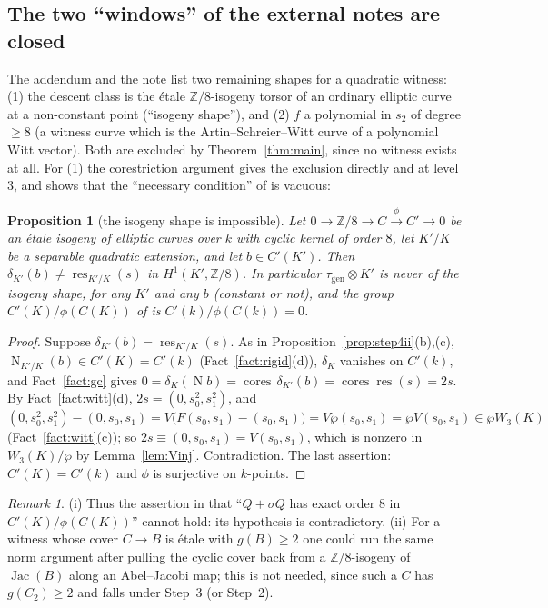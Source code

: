 \documentclass[11pt]{amsart}
\newtheorem{proposition}[theorem]{Proposition}
\theoremstyle{definition}
\theoremstyle{remark}
\newtheorem{remark}[theorem]{Remark}
\newcommand{\gen}{\mathrm{gen}}
\newcommand{\Z}{\mathbb Z}
\newcommand{\res}{\operatorname{res}}
\newcommand{\cores}{\operatorname{cores}}
\newcommand{\Nm}{\operatorname{N}}
\begin{document}
\subsection{The two ``windows'' of the external notes are closed}

The addendum \cite[Remark 11.12]{A} and the note \cite[Cor.~7.2]{S} list
two remaining shapes for a quadratic witness: (1) the descent class is the \'etale
$\Z/8$-isogeny torsor of an ordinary elliptic curve at a non-constant point (``isogeny
shape''), and (2) $f$ a polynomial in $s_2$ of degree $\ge8$ (a witness curve which is the
Artin--Schreier--Witt curve of a polynomial Witt vector). Both are excluded by
Theorem~\ref{thm:main}, since no witness exists at all. For (1) the corestriction
argument gives the exclusion directly and at level $3$, and shows that the ``necessary
condition'' of \cite[Prop.~7.1]{S} is vacuous:

\begin{proposition}[the isogeny shape is impossible]\label{prop:isogeny3}
Let $0\to\Z/8\to C\xrightarrow{\phi}C'\to0$ be an \'etale isogeny of elliptic curves over
$k$ with cyclic kernel of order $8$, let $K'/K$ be a separable quadratic extension, and
let $b\in C'(K')$. Then $\delta_{K'}(b)\ne\res_{K'/K}(s)$ in $H^1(K',\Z/8)$. In
particular $\tau_{\gen}\otimes K'$ is never of the isogeny shape, for any $K'$ and any
$b$ (constant or not), and the group $C'(K)/\phi(C(K))$ of \cite[Prop.~7.1]{S} is
$C'(k)/\phi(C(k))=0$.
\end{proposition}

\begin{proof}
Suppose $\delta_{K'}(b)=\res_{K'/K}(s)$. As in Proposition~\ref{prop:step4ii}(b),(c),
$\Nm_{K'/K}(b)\in C'(K)=C'(k)$ (Fact~\ref{fact:rigid}(d)), $\delta_K$ vanishes on
$C'(k)$, and Fact~\ref{fact:gc} gives
$0=\delta_K(\Nm b)=\cores\,\delta_{K'}(b)=\cores\res(s)=2s$. By Fact~\ref{fact:witt}(d),
$2s=(0,s_0^2,s_1^2)$, and
\[
(0,s_0^2,s_1^2)-(0,s_0,s_1)=V\bigl(F(s_0,s_1)-(s_0,s_1)\bigr)=V\wp(s_0,s_1)=\wp V(s_0,s_1)\in\wp W_3(K)
\]
(Fact~\ref{fact:witt}(c)); so $2s\equiv(0,s_0,s_1)=V(s_0,s_1)$, which is nonzero in
$W_3(K)/\wp$ by Lemma~\ref{lem:Vinj}. Contradiction. The last assertion:
$C'(K)=C'(k)$ and $\phi$ is surjective on $k$-points.
\end{proof}

\begin{remark}
(i) Thus the assertion in \cite[Prop.~7.1]{S} that ``$Q+\sigma Q$ has exact order $8$ in
$C'(K)/\phi(C(K))$'' cannot hold: its hypothesis is contradictory. (ii) For a witness
whose cover $C\to B$ is \'etale with $g(B)\ge2$ one could run the same norm argument
after pulling the cyclic cover back from a $\Z/8$-isogeny of $\operatorname{Jac}(B)$
along an Abel--Jacobi map; this is not needed, since such a $C$ has $g(C_2)\ge2$ and
falls under Step~3 (or Step~2).
\end{remark}
\end{document}
